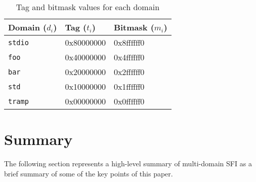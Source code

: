 \documentclass[12pt]{article}
\begin{document}
\begin{table}[H]
\centering
\begin{tabular}{@{}lll@{}}
\rowcolor[HTML]{EFEFEF} 
\textbf{Domain ($d_i$)} & \textbf{Tag ($t_i$)} & \textbf{Bitmask ($m_i$)} \\ \midrule
\texttt{stdio}          & 0x80000000           & 0x8ffffff0               \\
\rowcolor[HTML]{EFEFEF} 
\texttt{foo}            & 0x40000000           & 0x4ffffff0               \\
\texttt{bar}            & 0x20000000           & 0x2ffffff0               \\
\rowcolor[HTML]{EFEFEF} 
\texttt{std}            & 0x10000000           & 0x1ffffff0               \\
\texttt{tramp}          & 0x00000000           & 0x0ffffff0              
\end{tabular}

\caption{Tag and bitmask values for each domain}
\label{tbl:masks}
\end{table}

\section{Summary}

The following section represents a high-level summary of multi-domain SFI as a brief summary of some of the key points of this paper.
\end{document}
